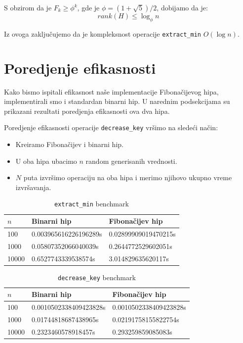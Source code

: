 \documentclass[a4paper]{article}
\theoremstyle{plain}
\theoremstyle{definition}
\begin{document}
S obzirom da je $F_{k} \geq \phi^{k}$, gde je $\phi = (1 + \sqrt{5}) / 2$, dobijamo da je:
$$rank(H) \leq \log_{\phi}{n} $$

Iz ovoga zaklju\v{c}ujemo da je kompleksnost operacije \texttt{extract\_min} $O(\log{n})$.

\section{Poredjenje efikasnosti}
\label{sec:Exp}
Kako bismo ispitali efikasnost na\v{s}e implementacije Fibona\v{c}ijevog hipa, implementirali smo i standardan binarni hip. U narednim podsekcijama su prikazani rezultati poredjenja efikasnosti ova dva hipa.

Poredjenje efikasnosti operacije \texttt{decrease\_key} vr\v{s}imo na slede\'{c}i na\v{c}in:
\begin{itemize}
    \item Kreiramo Fibona\v{c}ijev i binarni hip.
    \item U oba hipa ubacimo $n$ random generisanih vrednosti.
    \item $N$ puta izvr\v{s}imo operaciju na oba hipa i merimo njihovo ukupno vreme izvr\v{s}avanja.
\end{itemize}

\begin{table}[H]
    \centering
    \begin{tabular}{|l|l|l|}
        \hline
        $n$    & Binarni hip           & Fibona\v{c}ijev hip  \\
        \hline
        100    & 0.003965616226196289s & 0.02899909019470215s \\
        1000   & 0.05807352066040039s  & 0.2644772529602051s  \\
        10000  & 0.6527743339538574s   & 3.014829635620117s   \\
        \hline
    \end{tabular}
\label{tbl:fig1}
\caption{\texttt{extract\_min} benchmark}
\end{table}

\begin{table}[H]
    \centering
    \begin{tabular}{|l|l|l|}
        \hline
        $n$    & Binarni hip            & Fibona\v{c}ijev hip    \\
        \hline
        100    & 0.0010502338409423828s & 0.0010502338409423828s \\
        1000   & 0.01744818687438965s   & 0.02191758155822754s   \\
        10000  & 0.2323460578918457s    & 0.293259859085083s     \\
        \hline
    \end{tabular}
\label{tbl:fig1}
\caption{\texttt{decrease\_key} benchmark}
\end{table}


\appendix



\end{document}
